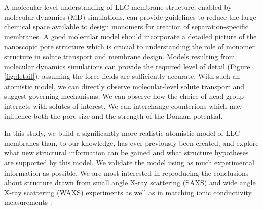 \documentclass[journal=jpcbfk,manuscript=article]{achemso}
\begin{document}
  A molecular-level understanding of LLC membrane structure, enabled by
  molecular dynamics (MD) simulations, can provide guidelines to reduce the large
  chemical space available to design monomers for creation of separation-specific
  membranes. A good molecular model should incorporate a detailed picture of the
  nanoscopic pore structure which is crucial to understanding the role of
  monomer structure in solute transport and membrane design. Models resulting
  from molecular dynamics simulations can provide the required level of detail
  (Figure \ref{fig:detail}), assuming the force fields are sufficiently accurate.
  With such an atomistic model, we can directly observe molecular-level solute
  transport and suggest governing mechanisms. We can observe how the choice of
  head group interacts with solutes of interest. We can interchange
  counterions which may influence both the pore size and the strength of the
  Donnan potential. 

  In this study, we build a significantly more realistic atomistic model of LLC
  membranes than, to our knowledge, has ever previously been created, and explore
  what new structural information can be gained and what structure hypotheses are
  supported by this model. We validate the model using as much experimental
  information as possible. We are most interested in reproducing the conclusions
  about structure drawn from small angle X-ray scattering (SAXS)
  and wide angle X-ray scattering (WAXS) experiments as well as in matching ionic
  conductivity measurements \cite{feng_thin_2016}.
\end{document}
